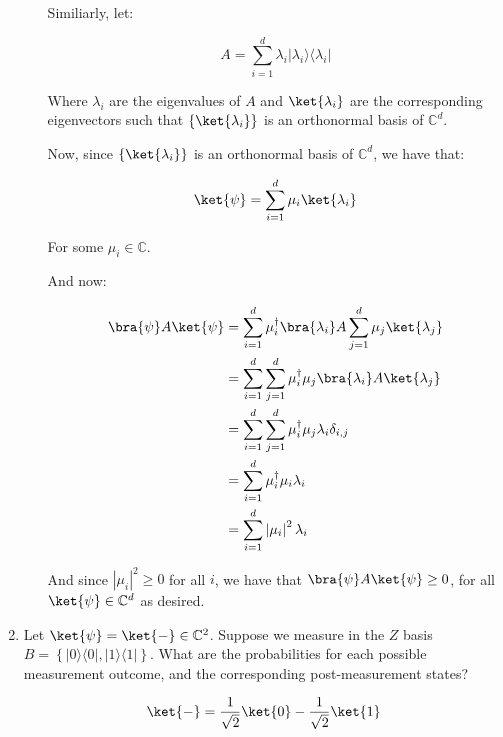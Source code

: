 \documentclass{article}
\newcommand{\ketbra}[2]{|#1\rangle\!\langle #2|}
\newcommand{\set}[1]{{\left\{#1\right\}}}    %
\newcommand{\abs}[1]{\left\lvert #1 \right\rvert}
\newcommand{\complex}{{\mathbb C}}
\begin{document}
\begin{enumerate}
\begin{enumerate}
                Similiarly, let:

                $$A=\sum_{i=1}^d \lambda_i \ketbra{\lambda_i}{\lambda_i}$$

                Where $\lambda_i$ are the eigenvalues of $A$ and $\ket{\lambda_i}$ are the corresponding eigenvectors such that $\{\ket{\lambda_i}\}$ is an orthonormal basis of $\complex^d$.

                Now, since $\{\ket{\lambda_i}\}$ is an orthonormal basis of $\complex^d$, we have that:

                $$\ket{\psi}=\sum_{i=1}^d \mu_i \ket{\lambda_i}$$

                For some $\mu_i\in\complex$.

                And now:

                $$\begin{aligned}
                    \bra{\psi}A\ket{\psi} & =\sum_{i=1}^d \mu_i^\dagger \bra{\lambda_i}A\sum_{j=1}^d \mu_j \ket{\lambda_j} \\
                                          & =\sum_{i=1}^d \sum_{j=1}^d \mu_i^\dagger \mu_j \bra{\lambda_i}A\ket{\lambda_j} \\
                                          & =\sum_{i=1}^d \sum_{j=1}^d \mu_i^\dagger \mu_j \lambda_i \delta_{i,j}          \\
                                          & =\sum_{i=1}^d \mu_i^\dagger \mu_i \lambda_i                                    \\
                                          & =\sum_{i=1}^d \abs{\mu_i}^2 \lambda_i                                          \\
                  \end{aligned}$$

                And since $\abs{\mu_i}^2\geq0$ for all $i$, we have that $\bra{\psi}A\ket{\psi}\geq0$, for all $\ket{\psi}\in\complex^d$ as desired.

        \end{enumerate}
  \item Let $\ket{\psi}=\ket{-}\in\complex^2$. Suppose we measure in the $Z$ basis $B=\set{\ketbra{0}{0},\ketbra{1}{1}}$. What are the probabilities for each possible measurement outcome, and the corresponding post-measurement states?

        $$\ket{-}=\frac{1}{\sqrt{2}}\ket{0}-\frac{1}{\sqrt{2}}\ket{1}$$


\end{enumerate}
\end{document}
